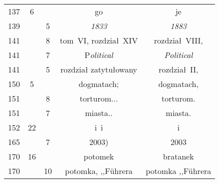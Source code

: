 \documentclass[a4paper,11pt]{article}
\begin{document}
\begin{center}
\begin{tabular}{|c|c|c|c|c|}
    137 & 6 & & go & je \\
    139 & & 5 & \emph{1833} & \emph{1883} \\
    141 & & 8 & tom~VI, rozdział~XIV & rozdział~VIII, \\
    141 & & 7 & P\emph{olitical} & \emph{Political} \\
    141 & & 5 & rozdział zatytułowany & rozdział~II, \\
    150 & 5 & & dogmatach; & dogmatach, \\
    151 & & 8 & torturom... & torturom. \\
    151 & & 7 & miasta.. & miasta. \\
    152 & 22 & & i~i & i \\
    165 & & 7 & 2003) & 2003 \\
    170 & 16 & & potomek & bratanek \\
    170 & & 10 & potomka, ,,F\"{u}hrera & potomka ,,F\"{u}hrera \\
    \hline
  \end{tabular}


\end{center}
\end{document}
